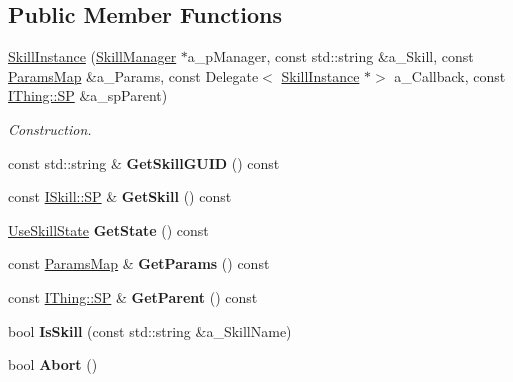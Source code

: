 \subsection*{Public Member Functions}
\begin{DoxyCompactItemize}
\item 
\mbox{\label{class_skill_instance_a515fed14e37c9594fd5957d38b9ce702}} 
\hyperlink{class_skill_instance_a515fed14e37c9594fd5957d38b9ce702}{Skill\+Instance} (\hyperlink{class_skill_manager}{Skill\+Manager} $\ast$a\+\_\+p\+Manager, const std\+::string \&a\+\_\+\+Skill, const \hyperlink{class_params_map}{Params\+Map} \&a\+\_\+\+Params, const Delegate$<$ \hyperlink{class_skill_instance}{Skill\+Instance} $\ast$$>$ a\+\_\+\+Callback, const \hyperlink{class_i_thing_a6e95654aef6362c48b9a2fd44a1f970a}{I\+Thing\+::\+SP} \&a\+\_\+sp\+Parent)
\begin{DoxyCompactList}\small\item\em Construction. \end{DoxyCompactList}\item 
\mbox{\label{class_skill_instance_ac407971cbe54230b62761856858a121d}} 
const std\+::string \& {\bfseries Get\+Skill\+G\+U\+ID} () const
\item 
\mbox{\label{class_skill_instance_ae83a4ab0eb67843effa460ab6f3638c5}} 
const \hyperlink{class_i_skill_a68bcce999ab0444eebaca3fb8ddb8a31}{I\+Skill\+::\+SP} \& {\bfseries Get\+Skill} () const
\item 
\mbox{\label{class_skill_instance_a4f42f818d3c85af8a94f4957fe7fcbf7}} 
\hyperlink{class_skill_instance_a19403519edc60dad57c324d9e976a811}{Use\+Skill\+State} {\bfseries Get\+State} () const
\item 
\mbox{\label{class_skill_instance_af05695c74673b5c16df1d86c7c5b5519}} 
const \hyperlink{class_params_map}{Params\+Map} \& {\bfseries Get\+Params} () const
\item 
\mbox{\label{class_skill_instance_a63f129e8dd614cba9f1567e1ba46d481}} 
const \hyperlink{class_i_thing_a6e95654aef6362c48b9a2fd44a1f970a}{I\+Thing\+::\+SP} \& {\bfseries Get\+Parent} () const
\item 
\mbox{\label{class_skill_instance_acd728fe75e8bd0ee20545b0db2795e8e}} 
bool {\bfseries Is\+Skill} (const std\+::string \&a\+\_\+\+Skill\+Name)
\item 
\mbox{\label{class_skill_instance_a20a4ab223ea7e8ff3f57c1e0d6a28320}} 
bool {\bfseries Abort} ()
\end{DoxyCompactItemize}
